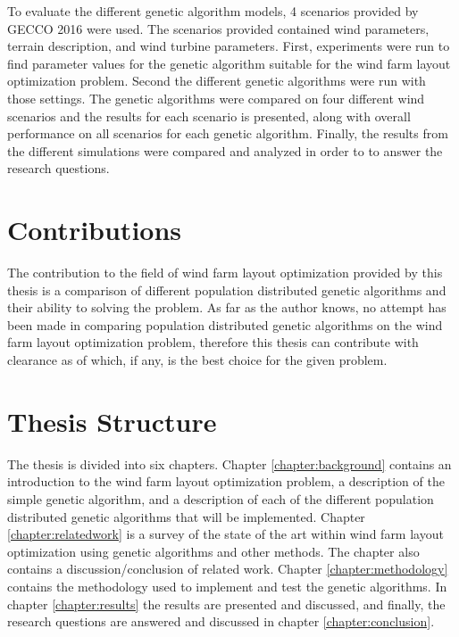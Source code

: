 \noindent To evaluate the different genetic algorithm models, 4 scenarios provided by GECCO 2016 were used. The scenarios provided contained wind parameters, terrain description, and wind turbine parameters. First, experiments were run to find parameter values for the genetic algorithm suitable for the wind farm layout optimization problem. Second the different genetic algorithms were run with those settings. The genetic algorithms were compared on four different wind scenarios and the results for each scenario is presented, along with overall performance on all scenarios for each genetic algorithm. Finally, the results from the different simulations were compared and analyzed in order to to answer the research questions.


\section{Contributions}\label{section:introduction contributions}
The contribution to the field of wind farm layout optimization provided by this thesis is a comparison of different population distributed genetic algorithms and their ability to solving the problem. As far as the author knows, no attempt has been made in comparing population distributed genetic algorithms on the wind farm layout optimization problem, therefore this thesis can contribute with clearance as of which, if any, is the best choice for the given problem.


\section{Thesis Structure}\label{thesisstructure}
The thesis is divided into six chapters. Chapter \ref{chapter:background} contains an introduction to the wind farm layout optimization problem, a description of the simple genetic algorithm, and a description of each of the different population distributed genetic algorithms that will be implemented. Chapter \ref{chapter:relatedwork} is a survey of the state of the art within wind farm layout optimization using genetic algorithms and other methods. The chapter also contains a discussion/conclusion of related work. Chapter \ref{chapter:methodology} contains the methodology used to implement and test the genetic algorithms. In chapter \ref{chapter:results} the results are presented and discussed, and finally, the research questions are answered and discussed in chapter \ref{chapter:conclusion}.